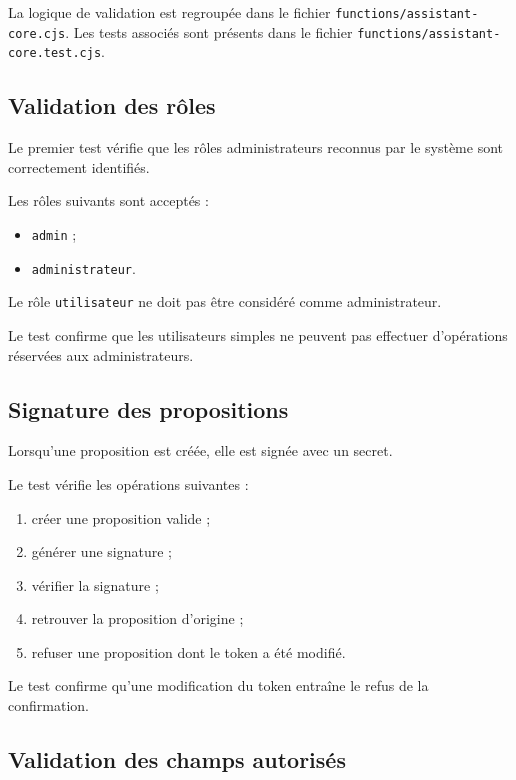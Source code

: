 \documentclass{rapportENSIAS}
\begin{document}
La logique de validation est regroupée dans le fichier \texttt{functions/assistant-core.cjs}. Les tests associés sont présents dans le fichier \texttt{functions/assistant-core.test.cjs}.

\subsection{Validation des rôles}

Le premier test vérifie que les rôles administrateurs reconnus par le système sont correctement identifiés.

Les rôles suivants sont acceptés :

\begin{itemize}
    \item \texttt{admin} ;
    \item \texttt{administrateur}.
\end{itemize}

Le rôle \texttt{utilisateur} ne doit pas être considéré comme administrateur.

Le test confirme que les utilisateurs simples ne peuvent pas effectuer d’opérations réservées aux administrateurs.

\subsection{Signature des propositions}

Lorsqu’une proposition est créée, elle est signée avec un secret.

Le test vérifie les opérations suivantes :

\begin{enumerate}
    \item créer une proposition valide ;
    \item générer une signature ;
    \item vérifier la signature ;
    \item retrouver la proposition d’origine ;
    \item refuser une proposition dont le token a été modifié.
\end{enumerate}

Le test confirme qu’une modification du token entraîne le refus de la confirmation.

\subsection{Validation des champs autorisés}
\end{document}
